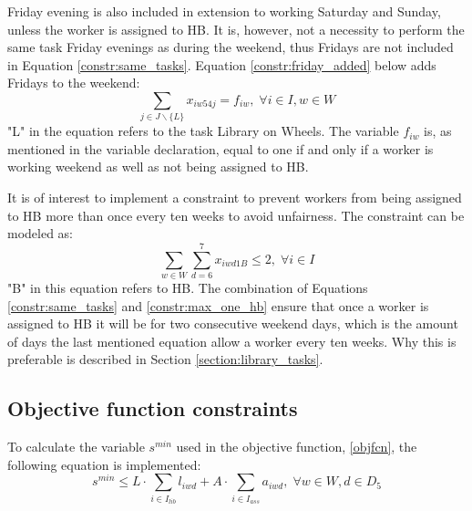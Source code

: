 Friday evening is also included in extension to working Saturday and Sunday, unless the worker is assigned to HB. It is, however, not a necessity to perform the same task Friday evenings as during the weekend, thus Fridays are not included in Equation \ref{constr:same_tasks}. Equation \ref{constr:friday_added} below adds Fridays to the weekend:
\begin{equation} \label{constr:friday_added}
\sum_{j \in J \backslash \{L\}}x_{iw54j} = f_{iw}, \; \forall i \in I, w \in W
\end{equation}
"L" in the equation refers to the task Library on Wheels. The variable $f_{iw}$ is, as mentioned in the variable declaration, equal to one if and only if a worker is working weekend as well as not being assigned to HB.

It is of interest to implement a constraint to prevent workers from being assigned to HB more than once every ten weeks to avoid unfairness. The constraint can be modeled as:
\begin{equation} \label{constr:max_one_hb}
\sum_{w \in W}\sum_{d = 6}^{7}x_{iwd1B} \leq 2, \; \forall i \in I
\end{equation}
"B" in this equation refers to HB. The combination of Equations \ref{constr:same_tasks} and \ref{constr:max_one_hb} ensure that once a worker is assigned to HB it will be for two consecutive weekend days, which is the amount of days the last mentioned equation allow a worker every ten weeks. Why this is preferable is described in Section \ref{section:library_tasks}.

\subsection{Objective function constraints} \label{section:obj_fcn_constraints}
To calculate the variable $s^{min}$ used in the objective function, \ref{objfcn}, the following equation is implemented:
\begin{equation} \label{constr:s_min}
s^{min} \leq L\cdot \sum_{i \in I_{lib}} l_{iwd} + A\cdot \sum_{i \in I_{ass}} a_{iwd}, \; \forall w \in W, d \in D_5
\end{equation}

